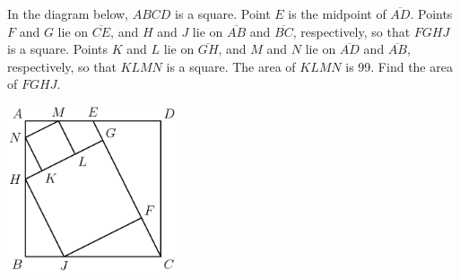 In the diagram below, $ABCD$ is a square. Point $E$ is the midpoint of $\overline{AD}$. Points $F$ and $G$ lie on $\overline{CE}$, and $H$ and $J$ lie on $\overline{AB}$ and $\overline{BC}$, respectively, so that $FGHJ$ is a square. Points $K$ and $L$ lie on $\overline{GH}$, and $M$ and $N$ lie on $\overline{AD}$ and $\overline{AB}$, respectively, so that $KLMN$ is a square. The area of $KLMN$ is 99. Find the area of $FGHJ$.
\begin{center}
\includegraphics[width = 50.400000000000006mm]{img/fig0.png}
\end{center}